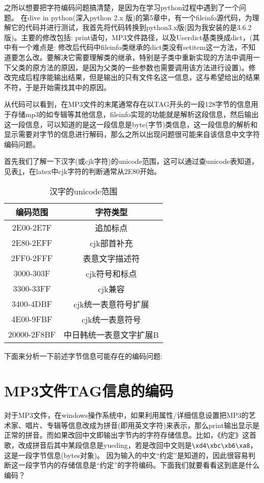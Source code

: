 \documentclass[twoside,11pt]{book}
\begin{document}
之所以想要把字符编码问题搞清楚，是因为在学习python过程中遇到了一个问题。
在dive in python(深入python 2.x 版)的第5章中，有一个fileinfo源代码，为理解它的代码并进行测试，我首先将代码转换到python3.x版(因为我安装的是3.6.2版)。主要的修改包括: print语句，MP3文件路径，以及Userdict基类换成dict，(其中有一个难点是: 修改后代码中fileinfo类继承的dict类没有setitem这一方法，不知道要怎么改。要解决它需要理解类的继承，特别是子类中重新实现的方法中调用一下父类的原方法的原因，是因为父类的一些参数也需要调用该方法进行设置)。修改完成后程序能输出结果，但是输出的只有文件名这一信息，这与希望给出的结果不符，于是开始需找其中的原因。

从代码可以看到，在MP3文件的末尾通常存在以TAG开头的一段128字节的信息用于存储mp3的如专辑等其他信息，fileinfo实现的功能就是解析这段信息，然后输出这一段信息，可以知道的是这一段信息是byte(字节)类信息，这一段信息的解析和显示需要对字节的信息进行解码，那么之所以出现问题很可能来自该信息中文字符编码问题。

首先我们了解一下汉字(或cjk字符)的unicode范围，这可以通过查unicode表知道，见表\ref{tab:unicode:cjk}，在latex中cjk字符的判断通常从2E80开始。

\begin{table}[!htb]
  \centering
  \caption{汉字的unicode范围}\label{tab:unicode:cjk}
  \begin{tabular}{|c|c|}
    \hline
    编码范围 & 字符类型 \\
    \hline
    2E00-2E7F &追加标点 \\
    2E80-2EFF &cjk部首补充 \\
    2FF0-2FFF &表意文字描述符 \\
    3000-303F &cjk符号和标点 \\
    3300-33FF &cjk兼容 \\
    3400-4DBF &cjk统一表意符号扩展 \\
    4E00-9FBF &cjk统一表意符号 \\
    20000-2F8BF &中日韩统一表意文字扩展B \\
    \hline
  \end{tabular}
\end{table}


下面来分析一下前述字节信息可能存在的编码问题:

\section{MP3文件TAG信息的编码}
对于MP3文件，在windows操作系统中，如果利用属性/详细信息设置把MP3的艺术家、唱片、专辑等信息改成为拼音(即用英文字符)来表示，那么print输出显示是正常的拼音。而如果改回中文即输出字节内的字符存储信息。比如，《约定》这首歌，改成拼音后其中某段信息是yueding，若是改回中文则是\lstinline!\xd4\xbc\xb6\xa8!，这是一段字节信息(bytes对象)。
因为输入的中文“约定”是知道的，因此很容易判断这一段字节内的存储信息是“约定”的字符编码。下面我们就要看看这到底是什么编码？
\end{document}
